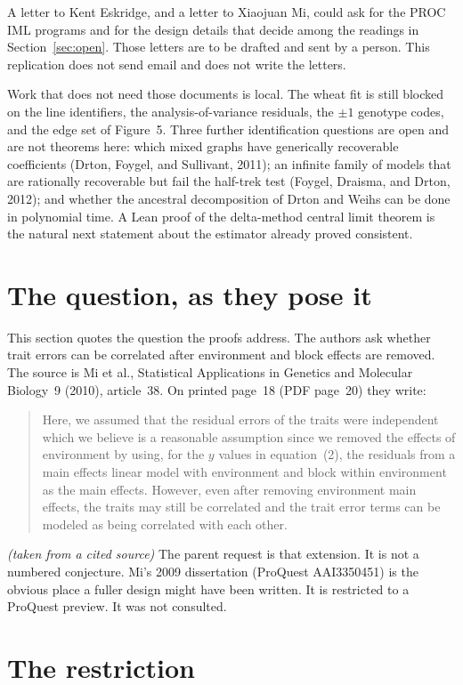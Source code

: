 \documentclass[11pt]{article}
\newcommand{\ev}[1]{\textup{\emph{(#1)}}}
\begin{document}
A letter to Kent Eskridge, and a letter to Xiaojuan Mi, could ask for the
PROC IML programs and for the design details that decide among the readings
in Section~\ref{sec:open}. Those letters are to be drafted and sent by a
person. This replication does not send email and does not write the letters.

Work that does not need those documents is local. The wheat fit is still
blocked on the line identifiers, the analysis-of-variance residuals, the
$\pm 1$ genotype codes, and the edge set of Figure~5. Three further
identification questions are open and are not theorems here: which mixed
graphs have generically recoverable coefficients (Drton, Foygel, and
Sullivant, 2011); an infinite family of models that are rationally
recoverable but fail the half-trek test (Foygel, Draisma, and Drton, 2012);
and whether the ancestral decomposition of Drton and Weihs can be done in
polynomial time. A Lean proof of the delta-method central limit theorem is
the natural next statement about the estimator already proved consistent.

\section{The question, as they pose it}

This section quotes the question the proofs address. The authors ask whether
trait errors can be correlated after environment and block effects are
removed. The source is Mi et al., Statistical Applications in Genetics and Molecular
Biology~9 (2010), article~38. On printed page~18 (PDF page~20) they write:
\begin{quote}
Here, we assumed that the residual errors of the traits were independent
which we believe is a reasonable assumption since we removed the effects of
environment by using, for the $y$ values in equation~(2), the residuals from
a main effects linear model with environment and block within environment as
the main effects. However, even after removing environment main effects, the
traits may still be correlated and the trait error terms can be modeled as
being correlated with each other.
\end{quote}
\ev{taken from a cited source}
The parent request is that extension. It is not a numbered conjecture. Mi's
2009 dissertation (ProQuest AAI3350451) is the obvious place a fuller design
might have been written. It is restricted to a ProQuest preview. It was not
consulted.

\section{The restriction}
\end{document}
